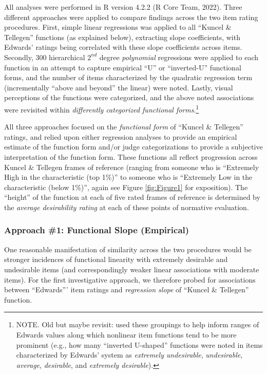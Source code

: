 \documentclass[
  ,jou]{apa6}
\begin{document}
All analyses were performed in R version 4.2.2 (R Core Team, 2022). Three different approaches were applied to compare findings across the two item rating procedures. First, simple linear regressions was applied to all ``Kuncel \& Tellegen'' functions (as explained below), extracting slope coefficients, with Edwards' ratings being correlated with these slope coefficients across items. Secondly, 300 hierarchical \(2^{nd}\) degree \emph{polynomial} regressions were applied to each function in an attempt to capture empirical ``U'' or ``inverted-U'' functional forms, and the number of items characterized by the quadratic regression term (incrementally ``above and beyond'' the linear) were noted. Lastly, visual perceptions of the functions were categorized, and the above noted associations were revisited within \emph{differently categorized functional forms}.\footnote{NOTE. Old but maybe revisit: used these groupings to help inform ranges of Edwards values along which nonlinear item functions tend to be more prominent (e.g., how many ``inverted U-shaped'' functions were noted in items characterized by Edwards' system as \emph{extremely undesirable}, \emph{undesirable}, \emph{average}, \emph{desirable}, and \emph{extremely desirable}).}

All three approaches focused on the \emph{functional form} of ``Kuncel \& Tellegen'' ratings, and relied upon either regression analyses to provide an empirical estimate of the function form and/or judge categorizations to provide a subjective interpretation of the function form. These functions all reflect progression across Kuncel \& Tellegen frames of reference (ranging from someone who is ``Extremely High in the characteristic (top 1\%)'' to someone who is ``Extremely Low in the characteristic (below 1\%)'', again see Figure \ref{fig:Figure1} for exposition). The ``height'' of the function at each of five rated frames of reference is determined by the \emph{average desirability rating} at each of these points of normative evaluation.

\subsubsection{Approach \#1: Functional Slope (Empirical)}\label{approach-1-functional-slope-empirical}

One reasonable manifestation of similarity across the two procedures would be stronger incidences of functional linearity with extremely desirable and undesirable items (and correspondingly weaker linear associations with moderate items). For the first investigative approach, we therefore probed for associations between ``Edwards''' item ratings and \emph{regression slope} of ``Kuncel \& Tellegen'' function.
\end{document}
